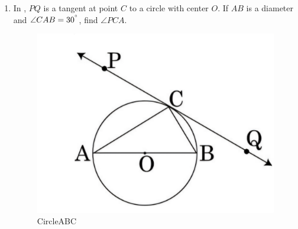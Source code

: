 \documentclass{article}
\begin{document}
\begin{enumerate}
        \item In , $PQ$ is a tangent at point $C$ to a circle with center $O$. If $AB$ is a diameter and $\angle CAB = 30^{\degree}$, find $\angle PCA$.
        \begin{figure}[H]
          \includegraphics[width=\columnwidth]{./figs/circleABC.jpg}
           \caption{CircleABC}
            \label{fig:circleABC}
         \end{figure}
	 \end{enumerate}
	 
\end{document}
